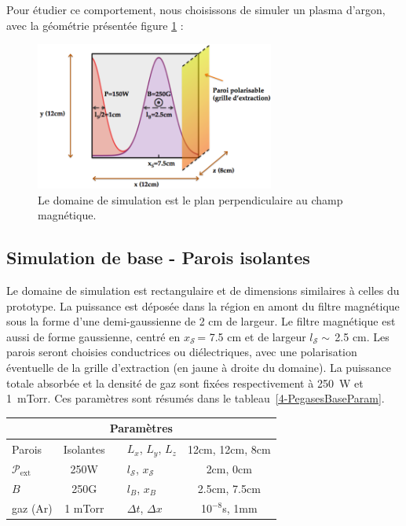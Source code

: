 \begin{refsection}
Pour étudier ce comportement, nous choisissons de
simuler un plasma d'argon, avec la géométrie présentée figure
\ref{4-pegasesSimDomain} :

\begin{figure}[!htbp]
\centering
\includegraphics[width=0.7\textwidth]{figures/4-pegasesSimDomain.png}
{\caption{Le domaine de simulation est le plan perpendiculaire au champ
magnétique.}
\label{4-pegasesSimDomain}}
\end{figure}

\subsection{Simulation de base - Parois isolantes}

Le domaine de simulation est rectangulaire et de
dimensions similaires à celles du prototype. La puissance est déposée dans la
région en amont du filtre magnétique sous la forme d'une demi-gaussienne de 2 cm
de largeur. Le filtre magnétique est aussi de forme gaussienne, centré en
$x_\mathcal{S}\,$= 7.5 cm et de largeur $l_\mathcal{S}\sim\,$2.5 cm. Les parois
seront choisies conductrices ou diélectriques, avec une polarisation éventuelle de la grille
d'extraction (en jaune à droite du domaine). La puissance totale absorbée et la
densité de gaz sont fixées respectivement à 250~W et 1~mTorr. Ces paramètres
sont résumés dans le tableau~\ref{4-PegasesBaseParam}.

\begin{minipage}{\textwidth}
\footnotesize\centering
{}
\begin{tabular}{lcclc}\toprule
\multicolumn{5}{c}{\bf Paramètres}\\
\midrule 
Parois & Isolantes &&$L_x$, $L_y$, $L_z$  & 12cm, 12cm,
8cm\\
$\mathcal{P}_\text{ext}$&250W&&$l_\mathcal{S}$, $x_\mathcal{S}$&2cm, 0cm\\
$B$&250G&&$l_B$, $x_B$&2.5cm, 7.5cm\\
gaz (Ar) & 1 mTorr &&$\Delta t$, $\Delta x$&10$^{-8}$s,
1mm\\
\bottomrule
\end{tabular}
\label{4-PegasesBaseParam}
\end{minipage}


\end{refsection}
